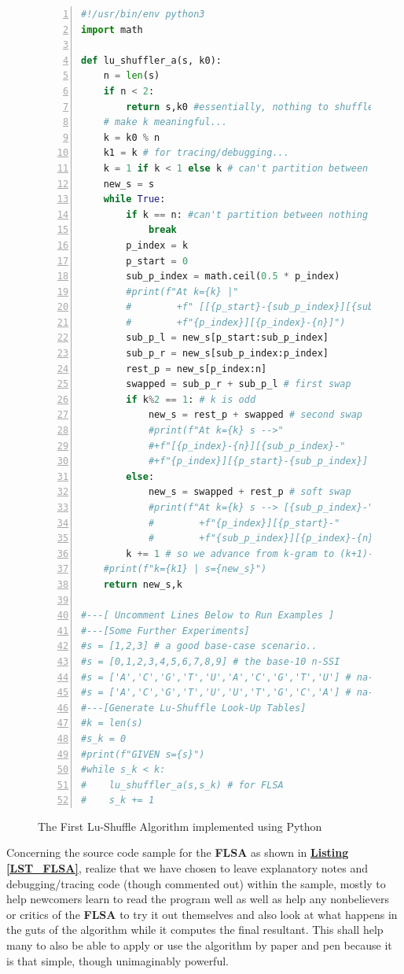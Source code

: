 \documentclass[a4paper, 18pt]{book} %
\begin{document}
\begin{figure}[H]
  \begin{center}
  \begin{lstlisting}[caption={The FLSA}, label={LST_FLSA}, language=Python, frame=single, numbers=left, basicstyle=\ttfamily,  commentstyle=\color{blue}]
#!/usr/bin/env python3
import math

def lu_shuffler_a(s, k0):
    n = len(s)
    if n < 2:
        return s,k0 #essentially, nothing to shuffle
    # make k meaningful...
    k = k0 % n
    k1 = k # for tracing/debugging...
    k = 1 if k < 1 else k # can't partition between nothing
    new_s = s
    while True:
        if k == n: #can't partition between nothing
            break
        p_index = k
        p_start = 0
        sub_p_index = math.ceil(0.5 * p_index)
        #print(f"At k={k} |"
        #        +f" [[{p_start}-{sub_p_index}][{sub_p_index}-"
        #        +f"{p_index}][{p_index}-{n}]")
        sub_p_l = new_s[p_start:sub_p_index]
        sub_p_r = new_s[sub_p_index:p_index]
        rest_p = new_s[p_index:n]
        swapped = sub_p_r + sub_p_l # first swap
        if k%2 == 1: # k is odd
            new_s = rest_p + swapped # second swap
            #print(f"At k={k} s -->"
            #+f"[{p_index}-{n}][{sub_p_index}-"
            #+f"{p_index}][{p_start}-{sub_p_index}] == {new_s}")
        else:
            new_s = swapped + rest_p # soft swap
            #print(f"At k={k} s --> [{sub_p_index}-"
            #        +f"{p_index}][{p_start}-"
            #        +f"{sub_p_index}][{p_index}-{n}] == {new_s}")
        k += 1 # so we advance from k-gram to (k+1)-grams
    #print(f"k={k1} | s={new_s}")
    return new_s,k

#---[ Uncomment Lines Below to Run Examples ]
#---[Some Further Experiments]
#s = [1,2,3] # a good base-case scenario..
#s = [0,1,2,3,4,5,6,7,8,9] # the base-10 n-SSI
#s = ['A','C','G','T','U','A','C','G','T','U'] # na-SS+na-SS
#s = ['A','C','G','T','U','U','T','G','C','A'] # na-SS+complement(na-SS)
#---[Generate Lu-Shuffle Look-Up Tables]
#k = len(s)
#s_k = 0
#print(f"GIVEN s={s}")
#while s_k < k:
#    lu_shuffler_a(s,s_k) # for FLSA
#    s_k += 1
\end{lstlisting}
  \end{center}
  \caption{The First Lu-Shuffle Algorithm implemented using Python}
\end{figure}


Concerning the source code sample for the \textbf{FLSA} as shown in \textbf{\hyperref[LST_FLSA]{Listing \ref{LST_FLSA}}}, realize that we have chosen to leave explanatory notes and debugging/tracing code (though commented out) within the sample, mostly to help newcomers learn to read the program well as well as help any nonbelievers or critics of the \textbf{FLSA} to try it out themselves and also look at what happens in the guts of the algorithm while it computes the final resultant. This shall help many to also be able to apply or use the algorithm by paper and pen because it is that simple, though unimaginably powerful.
\end{document}
